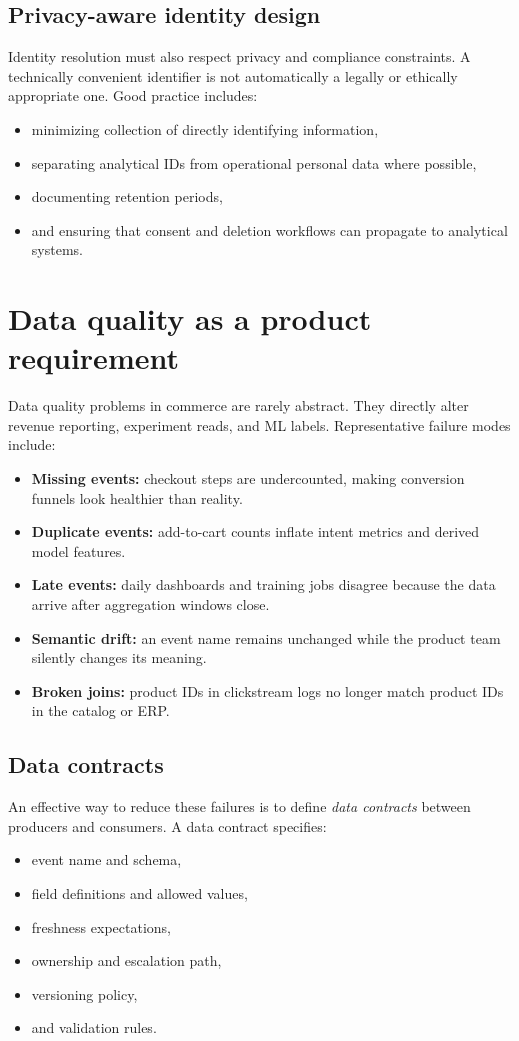 \subsection{Privacy-aware identity design}
Identity resolution must also respect privacy and compliance constraints.
A technically convenient identifier is not automatically a legally or ethically appropriate one.
Good practice includes:
\begin{itemize}
  \item minimizing collection of directly identifying information,
  \item separating analytical IDs from operational personal data where possible,
  \item documenting retention periods,
  \item and ensuring that consent and deletion workflows can propagate to analytical systems.
\end{itemize}

\section{Data quality as a product requirement}
Data quality problems in commerce are rarely abstract.
They directly alter revenue reporting, experiment reads, and ML labels.
Representative failure modes include:
\begin{itemize}
  \item \textbf{Missing events:} checkout steps are undercounted, making conversion funnels look healthier than reality.
  \item \textbf{Duplicate events:} add-to-cart counts inflate intent metrics and derived model features.
  \item \textbf{Late events:} daily dashboards and training jobs disagree because the data arrive after aggregation windows close.
  \item \textbf{Semantic drift:} an event name remains unchanged while the product team silently changes its meaning.
  \item \textbf{Broken joins:} product IDs in clickstream logs no longer match product IDs in the catalog or ERP.
\end{itemize}

\subsection{Data contracts}
An effective way to reduce these failures is to define \emph{data contracts} between producers and consumers.
A data contract specifies:
\begin{itemize}
  \item event name and schema,
  \item field definitions and allowed values,
  \item freshness expectations,
  \item ownership and escalation path,
  \item versioning policy,
  \item and validation rules.
\end{itemize}

